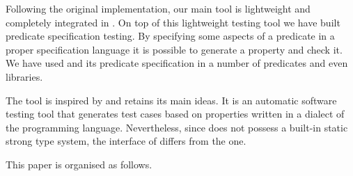 Following the original \QuickCheck{} implementation, our main tool is
lightweight and completely integrated in \Prolog{}.
%
On top of this lightweight testing tool we have built predicate
specification testing.
%
By specifying some aspects of a predicate in a proper specification
language it is possible to generate a \plqc{} property and check it.
%
We have used \plqc{} and its predicate specification in a number of
predicates and even libraries.

The \plqc{} tool is inspired by \QuickCheck{} and retains its main
ideas.
%
It is an automatic software testing tool that generates test cases based
on properties written in a dialect of the programming language.
%
Nevertheless, since \Prolog{} does not possess a built-in static strong
type system, the interface of \plqc{} differs from the \Haskell{}
\QuickCheck{} one.




This paper is organised as follows.
%


